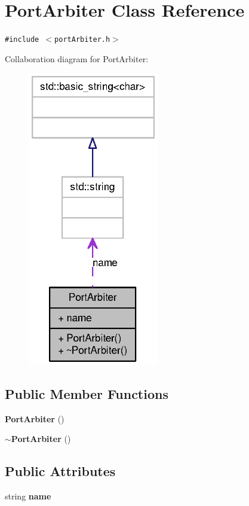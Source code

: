 \section{PortArbiter Class Reference}
\label{classPortArbiter}
{\tt \#include $<$portArbiter.h$>$}

Collaboration diagram for PortArbiter:\nopagebreak
\begin{figure}[H]
\begin{center}
\leavevmode
\includegraphics[width=162pt]{classPortArbiter__coll__graph}
\end{center}
\end{figure}
\subsection*{Public Member Functions}
\begin{CompactItemize}
\item 
{\bf PortArbiter} ()
\item 
{\bf $\sim$PortArbiter} ()
\end{CompactItemize}
\subsection*{Public Attributes}
\begin{CompactItemize}
\item 
string {\bf name}
\end{CompactItemize}


